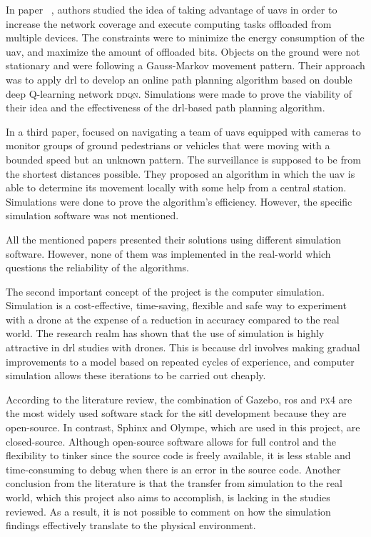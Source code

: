 \documentclass[../main.tex]{subfiles}
\begin{document}
		
		In paper ~\cite{pen21}, authors \citeauthor{pen21} studied the idea of taking advantage of \glspl{uav} in order to increase the network coverage and execute computing tasks offloaded from multiple devices. 
		The constraints were to minimize the energy consumption of the \gls{uav}, and maximize the amount of offloaded bits. 
		Objects on the ground were not stationary and were following a Gauss-Markov movement pattern. Their approach was to apply \gls{drl} to develop an online path planning algorithm based on double deep Q-learning network \textsc{ddqn}.
		Simulations were made to prove the viability of their idea and the effectiveness of the \gls{drl}-based path planning algorithm.
		
		In a third paper, \citeauthor{hua21} focused on navigating a team of \glspl{uav} equipped with cameras to monitor groups of ground pedestrians or vehicles that were moving with a bounded speed but an unknown pattern. 
		The surveillance is supposed to be from the shortest distances possible. 
		They proposed an algorithm in which the \gls{uav} is able to determine its movement locally with some help from a central station.
		Simulations were done to prove the algorithm's efficiency. However, the specific simulation software was not mentioned. 
		
		All the mentioned papers presented their solutions using different simulation software. However, none of them was implemented in the real-world which questions the reliability of the algorithms.




The second important concept of the project is the computer simulation.
Simulation is a cost-effective, time-saving, flexible 
and safe way to experiment with a drone
at the expense of a reduction in accuracy compared to the real world.
The research realm has shown that the use of simulation 
is highly attractive in \gls{drl} studies with drones.
This is because \gls{drl} involves
making gradual improvements to a model based on 
repeated cycles of experience, and computer simulation 
allows these iterations to be carried out cheaply.

According to the literature review, 
the combination of Gazebo, \gls{ros}
and \textsc{px4} are the most widely used software stack 
for the \gls{sitl} development
because they are open-source. 
In contrast, Sphinx and Olympe, which are used in this project, 
are closed-source.
Although open-source software 
allows for full control and the flexibility to tinker
since the source code is freely available,
it is less stable and time-consuming to debug
when there is an error in the source code.
Another conclusion from the literature is that 
the transfer from simulation to the real world,
which this project also aims to accomplish,
is lacking in the studies reviewed.
As a result, it is not possible to comment on 
how the simulation findings effectively translate
to the physical environment.
\end{document}

